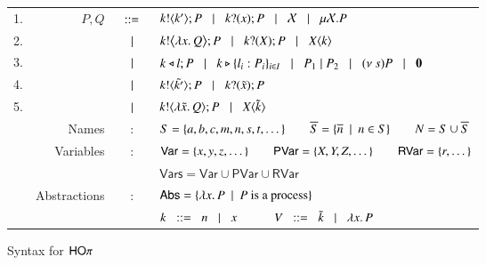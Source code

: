 \begin{figure}[t!]
		\begin{tabular}{lrcl}
			1. &	$P,Q$
			 	&$\;\;::=\;\;$&	$k ! \langle k' \rangle ; P \;\;\;|\;\;\; k ? (x) ; P \;\;\;|\;\;\; \mathcal{X} \;\;\;|\;\;\; \mu \mathcal{X}. P$ \\
			2. & 	&$\;\;\;|\;\;\;$&	$k ! \big\langle \lambda x.\,Q \big\rangle ; P \;\;\;|\;\;\; k ? (X) ; P \;\;\;|\;\;\; X\langle k \rangle$ \\ 
			3. & 	&$\;\;\;|\;\;\;$&	$k \triangleleft l ; P \;\;\;|\;\;\; k \triangleright \{l_i:P_i\}_{i \in I} \;\;\;|\;\;\; 
						P_1 \;|\; P_2 \;\;\;|\;\;\; (\nu\ s) P \;\;\;|\;\;\; \mathbf{0}$ \\
			4. & 	&$\;\;\;|\;\;\;$&	$k ! \langle \tilde{k'} \rangle ; P \;\;\;|\;\;\; k ? (\tilde{x}) ; P$\\
			5. & 	&$\;\;\;|\;\;\;$&	$k ! \langle \lambda \tilde{x}.\,Q \rangle ; P \;\;\;|\;\;\; X\langle \tilde{k} \rangle$\\
		&	Names & : & 	$S = \{a, b, c, m, n, s, t, \dots\} \qquad \overline{S} = \{\overline{n} \ \ |\ \  n \in S\} \qquad N = S \cup \overline{S}$\\
		&	Variables & : &	$\mathsf{Var} = \{x,y,z, \dots\} \qquad \mathsf{PVar} = \{X, Y, Z, \dots\}
					\qquad \mathsf{RVar} = \{r, \dots\}$\\
		&		& &	$\mathsf{Vars} = \mathsf{Var} \cup \mathsf{PVar} \cup \mathsf{RVar}$\\
		&	Abstractions & : & $\mathsf{Abs} = \{\lambda x.\,P \ \ |\ \  P \textrm{ is a process}\}$\\
		&		& &	$k \;\;::=\;\; n \;\;\;|\;\;\; x \quad \qquad V \;\;::=\;\; \tilde{k} \;\;\;|\;\;\; \lambda x.\,P$
		\end{tabular}
	\caption{Syntax for $\mathsf{HO}\pi$ \label{fig:syntax}}
\end{figure}

